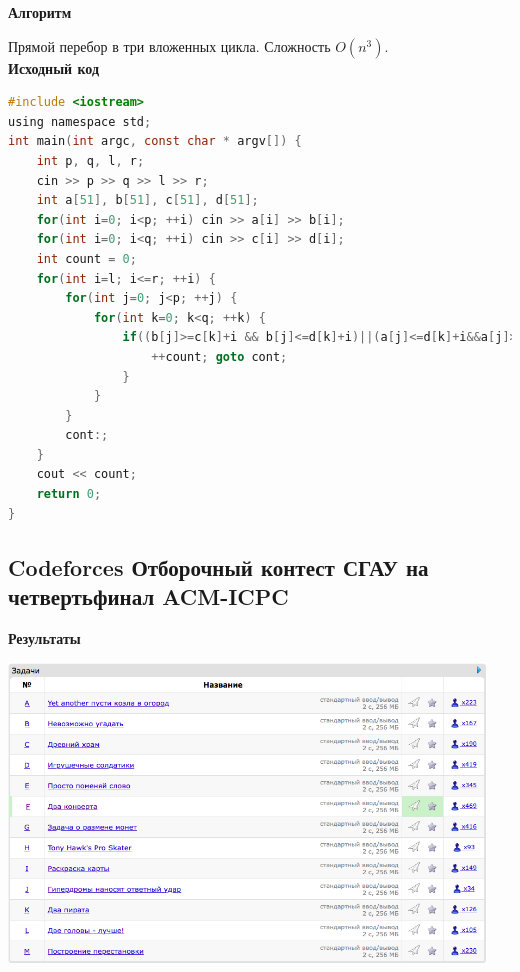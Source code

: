 \documentclass[a4paper,12pt]{article}
\begin{document}
\textbf{{\large Алгоритм}}

Прямой перебор в три вложенных цикла. Сложность $O(n^3)$.\\

\textbf{{\large Исходный код}} \\
\begin{lstlisting}[language=C]
#include <iostream>
using namespace std;
int main(int argc, const char * argv[]) {
    int p, q, l, r;
    cin >> p >> q >> l >> r;
    int a[51], b[51], c[51], d[51];
    for(int i=0; i<p; ++i) cin >> a[i] >> b[i];
    for(int i=0; i<q; ++i) cin >> c[i] >> d[i];
    int count = 0;
    for(int i=l; i<=r; ++i) {
        for(int j=0; j<p; ++j) {
            for(int k=0; k<q; ++k) {
                if((b[j]>=c[k]+i && b[j]<=d[k]+i)||(a[j]<=d[k]+i&&a[j]>=c[k]+i)||(c[k]+i>=a[j]&&c[k]+i<=b[j])||(d[k]+i>=a[j]&&d[k]+i<=b[j])) {
                    ++count; goto cont;
                }
            }
        }
        cont:;
    }
    cout << count;
    return 0;
}
\end{lstlisting}



%
%

\newpage
\subsection{Codeforces Отборочный контест СГАУ на четвертьфинал ACM-ICPC}

\textbf{{\large Результаты}} \\
\begin{center}
\includegraphics[width=0.95\textwidth]{CT_SGAU/A_CT_SGAU_result.png}\\ [1cm]
\end{center}
\end{document}
